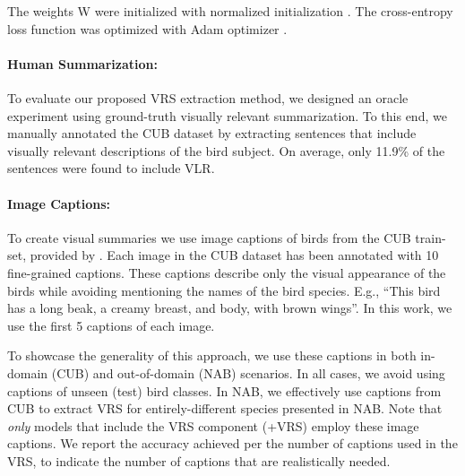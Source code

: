 \documentclass[11pt,a4paper]{article}
\newcommand\gal[1]{\textcolor{bright}{\textbf{GAL:} #1 }}
\newcommand\yuval[1]{\textcolor{darkpink}{\textbf{YUVAL:} #1 }}
\begin{document}
The weights W were initialized with normalized initialization \citep{glorot2010understanding}. The cross-entropy loss function was optimized with Adam optimizer \citep{Adam}.




\paragraph{Human Summarization:} 
To evaluate our proposed VRS extraction method, we designed an oracle experiment using ground-truth visually relevant summarization. To this end, we manually annotated the CUB dataset by extracting sentences that include visually relevant descriptions of the bird subject. On average, only 11.9\% of the sentences were found to include VLR. 

\paragraph{Image Captions:}
To create visual summaries we use image captions of birds from the CUB train-set, provided by \citet{reed2016learning}. Each image in the CUB dataset has been annotated with 10 fine-grained captions. These captions describe only the visual appearance of the birds while avoiding mentioning the names of the bird species. E.g., \enquote{This bird has a long beak, a creamy breast, and body, with brown wings}. In this work, we use the first 5 captions of each image.


To showcase the generality of this approach, we use these captions in both in-domain (CUB) and out-of-domain (NAB) scenarios. In all cases, we avoid using captions of unseen (test) bird classes. In NAB, we effectively use captions from CUB to extract VRS for entirely-different species presented in NAB. Note that {\em only} models that include the VRS component (+VRS) employ these image captions. We report the accuracy achieved per the number of captions used in the VRS, to indicate the number of captions that are realistically needed.



\end{document}
